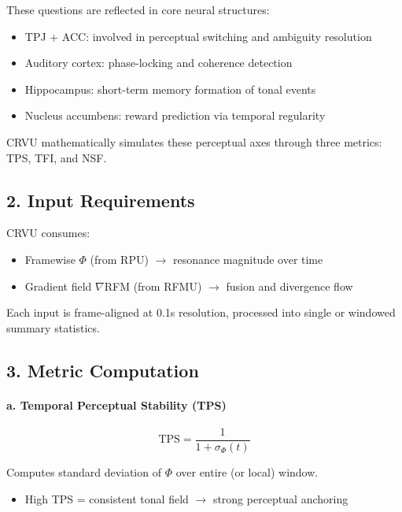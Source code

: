 \documentclass{article}
\begin{document}
These questions are reflected in core neural structures:

\begin{itemize}
    \item TPJ + ACC: involved in perceptual switching and ambiguity resolution
    \item Auditory cortex: phase-locking and coherence detection
    \item Hippocampus: short-term memory formation of tonal events
    \item Nucleus accumbens: reward prediction via temporal regularity
\end{itemize}

CRVU mathematically simulates these perceptual axes through three metrics: TPS, TFI, and NSF.

\subsection*{2. Input Requirements}

CRVU consumes:

\begin{itemize}
    \item Framewise $\Phi$ (from RPU) $\rightarrow$ resonance magnitude over time
    \item Gradient field $\nabla$RFM (from RFMU) $\rightarrow$ fusion and divergence flow
\end{itemize}

Each input is frame-aligned at 0.1s resolution, processed into single or windowed summary statistics.

\subsection*{3. Metric Computation}

\paragraph{a. Temporal Perceptual Stability (TPS)}

\[
\text{TPS} = \frac{1}{1 + \sigma_\Phi(t)}
\]

Computes standard deviation of $\Phi$ over entire (or local) window.

\begin{itemize}
    \item High TPS = consistent tonal field $\rightarrow$ strong perceptual anchoring
\end{itemize}
\end{document}

